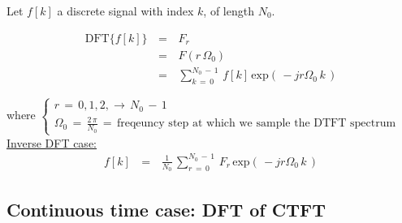 Let $f[k]$ a discrete signal with index $k$, of length $N_0$.


\begin{equation}
\begin{array}{rcl}
\text{DFT}\{f[k]\} \, &=&\, F_r \\
						&=& \, F(r \, \Omega_0) \\
					   &=&\, \displaystyle\sum_{k \, = \, 0}^{N_0 \, - \, 1} \, f[k] \, \text{exp} \left(\, -j r \Omega_0 \, k   \,\right)
\end{array}
\label{Eq:DFT:dft_for_dtft}
\end{equation}
 
where $\begin{cases}
r \, = \, 0,1,2, \rightarrow \, N_0 \, - \, 1 \\
\Omega_0 \, = \,  \displaystyle\frac{2 \, \pi}{N_0} \, = \, \text{freqeuncy step at which we sample the DTFT spectrum}
\end{cases}$\\


\underline{Inverse DFT case:}\\

\begin{equation}
\begin{array}{rcl}
f[k] \, &=&\, \displaystyle\frac{1}{N_0} \, \displaystyle\sum_{r \, = \, 0}^{N_0 \, - \, 1} \, F_r \, \text{exp} \left(\, -j r \Omega_0 \, k   \,\right)
\end{array}
\end{equation}

\newpage
\subsection{Continuous time case: DFT of CTFT}

